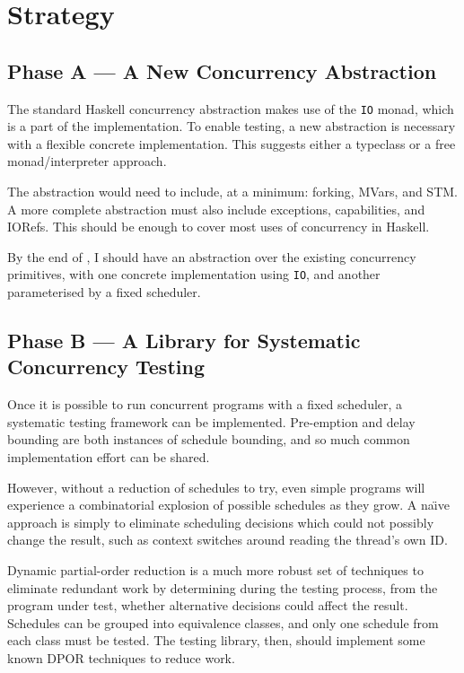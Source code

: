 \section{Strategy}
\label{sec:proposal-strategy}

\subsection{Phase A --- A New Concurrency Abstraction}
\label{sec:proposal-strategy-abstraction}


The standard Haskell concurrency abstraction makes use of the
\verb|IO| monad, which is a part of the implementation. To enable
testing, a new abstraction is necessary with a flexible concrete
implementation. This suggests either a typeclass or a free
monad/interpreter approach.

The abstraction would need to include, at a minimum: forking, MVars,
and STM. A more complete abstraction must also include exceptions,
capabilities, and IORefs. This should be enough to cover most uses of
concurrency in Haskell.

By the end of , I should have an abstraction over the existing
concurrency primitives, with one concrete implementation using
\verb|IO|, and another parameterised by a fixed scheduler.

\subsection{Phase B --- A Library for Systematic Concurrency Testing}
\label{sec:proposal-strategy-sct}


Once it is possible to run concurrent programs with a fixed scheduler,
a systematic testing framework can be implemented. Pre-emption and
delay bounding are both instances of schedule bounding, and so much
common implementation effort can be shared.

However, without a reduction of schedules to try, even simple programs
will experience a combinatorial explosion of possible schedules as
they grow. A na\"{\i}ve approach is simply to eliminate scheduling
decisions which could not possibly change the result, such as context
switches around reading the thread's own ID.

Dynamic partial-order reduction is a much
more robust set of techniques to eliminate redundant work by
determining during the testing process, from the program under test,
whether alternative decisions could affect the result. Schedules can
be grouped into equivalence classes, and only one schedule from each
class must be tested. The testing library, then, should implement some
known DPOR techniques to reduce work.

